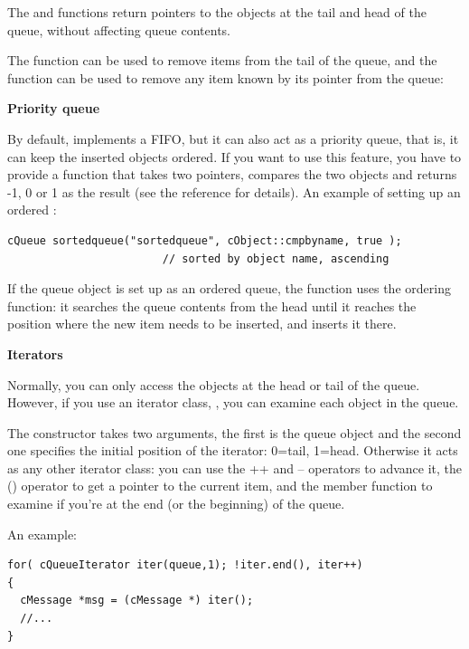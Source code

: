 The  and  functions return pointers to the objects 
at the tail and head of the queue, without affecting queue contents. 



The  function can be used to remove items from the
tail of the queue, and the  function can be
used to remove any item known by its pointer from the queue:





\textbf{Priority queue}


By default,  implements a FIFO, but it can also act as
a priority queue, that is, it can keep the inserted objects
ordered.  If you want to use this feature, you have
to provide a function that takes two  pointers,
compares the two objects and returns -1, 0 or 1 as the result (see the
reference for details).  An example of setting up an ordered
:

\begin{Verbatim}
cQueue sortedqueue("sortedqueue", cObject::cmpbyname, true );
                        // sorted by object name, ascending
\end{Verbatim}


If the queue object is set up as an ordered queue, the  
function uses the ordering function: it searches the queue contents 
from the head until it reaches the position where the new item 
needs to be inserted, and inserts it there. 


\textbf{Iterators}


Normally, you can only access the objects at the head or tail of the
queue. However, if you use an iterator class, ,
you can examine each object in the queue.

The  constructor takes two arguments, the first
is the queue object and the second one specifies the initial position
of the iterator: 0=tail, 1=head. Otherwise it acts as any other
{\opp} iterator class: you can use the ++ and -- operators to advance
it, the () operator to get a pointer to the current item, and the
 member function to examine if you're at the end (or the
beginning) of the queue.


An example:

\begin{Verbatim}
for( cQueueIterator iter(queue,1); !iter.end(), iter++)
{
  cMessage *msg = (cMessage *) iter();
  //...
}
\end{Verbatim}




